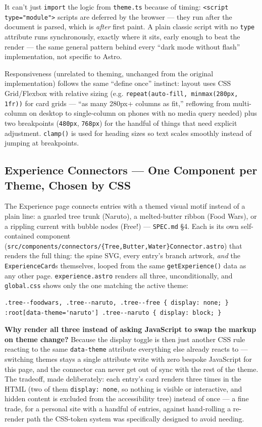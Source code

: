 \documentclass[11pt]{article}
\begin{document}
It can't just \texttt{import} the logic from \texttt{theme.ts} because of
timing: \texttt{<script type="module">} scripts are deferred by the
browser --- they run after the document is parsed, which is \emph{after}
first paint. A plain classic script with no \texttt{type} attribute runs
synchronously, exactly where it sits, early enough to beat the render ---
the same general pattern behind every ``dark mode without flash''
implementation, not specific to Astro.

Responsiveness (unrelated to theming, unchanged from the original
implementation) follows the same ``define once'' instinct: layout uses
CSS Grid/Flexbox with relative sizing (e.g.
\texttt{repeat(auto-fill, minmax(280px, 1fr))} for card grids --- ``as
many 280px+ columns as fit,'' reflowing from multi-column on desktop to
single-column on phones with no media query needed) plus two
breakpoints (\texttt{480px}, \texttt{768px}) for the handful of things
that need explicit adjustment. \texttt{clamp()} is used for heading
sizes so text scales smoothly instead of jumping at breakpoints.

\subsection{Experience Connectors --- One Component per Theme, Chosen by CSS}
\label{sec:connectors}

The Experience page connects entries with a themed visual motif instead
of a plain line: a gnarled tree trunk (Naruto), a melted-butter ribbon
(Food Wars), or a rippling current with bubble nodes (Free!) ---
\texttt{SPEC.md} \S4. Each is its own self-contained component
(\texttt{src/components/connectors/\{Tree,Butter,Water\}Connector.astro})
that renders the full thing: the spine SVG, every entry's branch
artwork, \emph{and} the \texttt{ExperienceCard}s themselves, looped from
the same \texttt{getExperience()} data as any other page.
\texttt{experience.astro} renders all three, unconditionally, and
\texttt{global.css} shows only the one matching the active theme:

\begin{lstlisting}
.tree--foodwars, .tree--naruto, .tree--free { display: none; }
:root[data-theme='naruto'] .tree--naruto { display: block; }
\end{lstlisting}

\textbf{Why render all three instead of asking JavaScript to swap the
markup on theme change?} Because the display toggle is then just another
CSS rule reacting to the same \texttt{data-theme} attribute everything
else already reacts to --- switching themes stays a single attribute
write with zero bespoke JavaScript for this page, and the connector can
never get out of sync with the rest of the theme. The tradeoff, made
deliberately: each entry's card renders three times in the HTML (two of
them \texttt{display: none}, so nothing is visible or interactive, and
hidden content is excluded from the accessibility tree) instead of once
--- a fine trade, for a personal site with a handful of entries, against
hand-rolling a re-render path the CSS-token system was specifically
designed to avoid needing.
\end{document}
